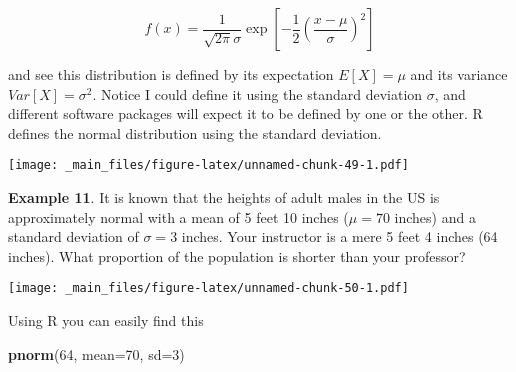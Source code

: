 \documentclass[]{book}
\newenvironment{Shaded}{\begin{snugshade}}{\end{snugshade}}
\newcommand{\KeywordTok}[1]{\textcolor[rgb]{0.13,0.29,0.53}{\textbf{{#1}}}}
\newcommand{\DataTypeTok}[1]{\textcolor[rgb]{0.13,0.29,0.53}{{#1}}}
\newcommand{\DecValTok}[1]{\textcolor[rgb]{0.00,0.00,0.81}{{#1}}}
\newcommand{\StringTok}[1]{\textcolor[rgb]{0.31,0.60,0.02}{{#1}}}
\newcommand{\NormalTok}[1]{{#1}}
\begin{document}
\[f(x)=\frac{1}{\sqrt{2\pi}\sigma}\exp\left[-\frac{1}{2}\left(\frac{x-\mu}{\sigma}\right)^{2}\right]\]

and see this distribution is defined by its expectation \(E[X]=\mu\) and
its variance \(Var[X]=\sigma^{2}\). Notice I could define it using the
standard deviation \(\sigma\), and different software packages will
expect it to be defined by one or the other. R defines the normal
distribution using the standard deviation.

\texttt{[image: \_main\_files/figure-latex/unnamed-chunk-49-1.pdf]}

\textbf{Example 11}. It is known that the heights of adult males in the
US is approximately normal with a mean of 5 feet 10 inches (\(\mu=70\)
inches) and a standard deviation of \(\sigma=3\) inches. Your instructor
is a mere 5 feet 4 inches (64 inches). What proportion of the population
is shorter than your professor?

\begin{Shaded}
\end{Shaded}

\texttt{[image: \_main\_files/figure-latex/unnamed-chunk-50-1.pdf]}

Using R you can easily find this

\begin{Shaded}
\begin{Highlighting}[]
\KeywordTok{pnorm}\NormalTok{(}\DecValTok{64}\NormalTok{, }\DataTypeTok{mean=}\DecValTok{70}\NormalTok{, }\DataTypeTok{sd=}\DecValTok{3}\NormalTok{)}
\end{Highlighting}
\end{Shaded}
\end{document}

